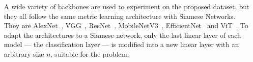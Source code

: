 A wide variety of backbones are used to experiment on the proposed dataset, but they all follow the same metric learning architecture with Siamese Networks. They are AlexNet~\cite{krizhevsky_imagenet_2012}, VGG~\cite{simonyan_very_2015}, ResNet~\cite{he_deep_2016}, MobileNetV3~\cite{howard_searching_2019}, EfficientNet~\cite{tan_efficientnet_2019} and \gls{ViT}~\cite{dosovitskiy_image_2021}. To adapt the architectures to a Siamese network, only the last linear layer of each model --- the classification layer --- is modified into a new linear layer with an arbitrary size $n$, suitable for the problem.
